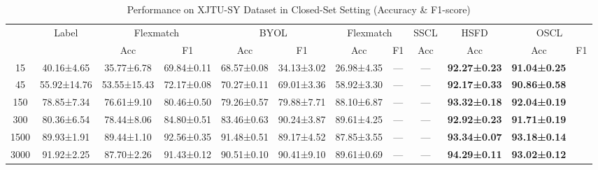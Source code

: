 \documentclass[journal]{IEEEtran}
\begin{document}
\begin{table}[!t]
\centering
\caption{Performance on XJTU-SY Dataset in Closed-Set Setting (Accuracy \& F1-score)}
\label{tab:xjtusy_closed_set}
\small
\setlength{\tabcolsep}{2.2pt}
\begin{tabular}{@{\hspace{2pt}}c|c|cc|cc|cc|c|c|cc@{\hspace{2pt}}}
  \toprule
  & Label & \multicolumn{2}{c}{Flexmatch} & \multicolumn{2}{c}{BYOL} & 
  \multicolumn{2}{c}{Flexmatch} & \multicolumn{1}{c}{SSCL} & 
  \multicolumn{1}{c}{HSFD} & \multicolumn{2}{c}{OSCL} \\
  \cmidrule{3-12}
  & & Acc & F1 & Acc & F1 & Acc & F1 & Acc & Acc & Acc & F1 \\
  \midrule
  15   & 40.16±4.65   & 35.77±6.78   & 69.84±0.11  & 68.57±0.08  & 34.13±3.02  & 26.98±4.35  & ---  & ---  & \textbf{92.27±0.23}  & \textbf{91.04±0.25} \\
  45   & 55.92±14.76  & 53.55±15.43  & 72.17±0.08  & 70.27±0.11  & 69.01±3.36  & 58.92±3.30  & ---  & ---  & \textbf{92.17±0.33}  & \textbf{90.86±0.58} \\
  150  & 78.85±7.34   & 76.61±9.10   & 80.46±0.50  & 79.26±0.57  & 79.88±7.71  & 88.10±6.87  & ---  & ---  & \textbf{93.32±0.18}  & \textbf{92.04±0.19} \\
  300  & 80.36±6.54   & 78.44±8.06   & 84.80±0.51  & 83.46±0.63  & 90.24±3.87  & 89.61±4.25  & ---  & ---  & \textbf{92.92±0.23}  & \textbf{91.71±0.19} \\
  1500 & 89.93±1.91   & 89.44±1.10   & 92.56±0.35  & 91.48±0.51  & 89.17±4.52  & 87.85±3.55  & ---  & ---  & \textbf{93.34±0.07}  & \textbf{93.18±0.14} \\
  3000 & 91.92±2.25   & 87.70±2.26   & 91.43±0.12  & 90.51±0.10  & 90.41±9.10  & 89.61±0.69  & ---  & ---  & \textbf{94.29±0.11}  & \textbf{93.02±0.12} \\
  \bottomrule
\end{tabular}
\end{table}
\end{document}
